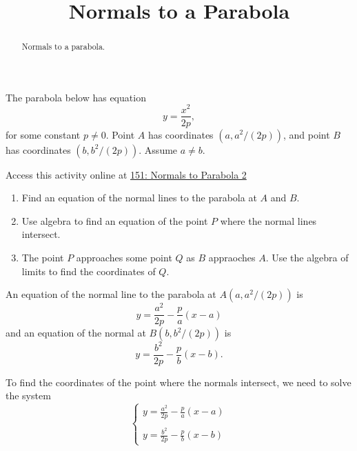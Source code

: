 \documentclass{ximera}
\title{Normals to a Parabola}
\begin{document}
\begin{abstract}
Normals to a parabola.
\end{abstract}
\maketitle


\begin{question} \label{Qpofer3}


 
The parabola below has equation 
\[
  y  = \frac{x^2}{2p} ,
\]
for some constant $p\neq 0$. Point $A$ has coordinates $(a,a^2/(2p))$, and point $B$ has coordinates $(b,b^2/(2p))$. 
Assume $a\neq b$.

\begin{onlineOnly}
    \begin{center}
\end{center}
\end{onlineOnly}
Access this activity online at \href{https://www.desmos.com/calculator/ifsu6n6qt0}{151: Normals to Parabola 2}

\begin{enumerate}


\item Find an equation of the normal lines to the parabola at $A$ and $B$.

\item Use algebra to find an equation of the point $P$ where the normal lines intersect.

\item The point $P$ approaches some point $Q$ as $B$ appraoches $A$. Use the algebra of limits to find the coordinates of $Q$.

\end{enumerate}

\begin{explanation}
An equation of the normal line to the parabola at $A(a,a^2/(2p))$ is
\[
   y = \frac{a^2}{2p} - \frac{p}{a}\left( x-a \right)
\] 
and an equation of the normal at $B(b,b^2/(2p))$ is
\[
  y = \frac{b^2}{2p} - \frac{p}{b}\left( x-b \right) .
\]

To find the coordinates of the point where the normals intersect, we need to solve the system
\[
\begin{cases}
      y = \frac{a^2}{2p} - \frac{p}{a}\left( x-a \right) \\ \\
      y = \frac{b^2}{2p} - \frac{p}{b}\left( x-b \right)
\end{cases}
\]


\end{explanation}
\end{question}
\end{document}
